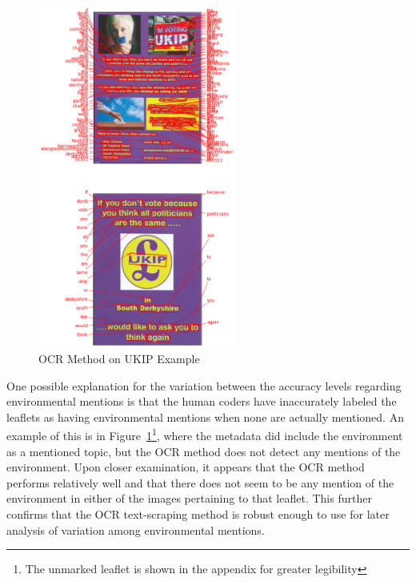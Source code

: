 \documentclass[12pt,letterpaper]{article}
\begin{document}
\vspace{1cm}





\begin{figure}
	\centering
	\includegraphics[width=0.58\textwidth]{ukip_example.png}
	\caption{OCR Method on UKIP Example}
	\label{fig:ukip_example}
\end{figure}




One possible explanation for the variation between the accuracy levels regarding environmental mentions is that the human coders have inaccurately labeled the leaflets as having environmental mentions when none are actually mentioned. An example of this is in Figure~\ref{fig:ukip_example}\footnote{The unmarked leaflet is shown in the appendix for greater legibility}, where the metadata did include the environment as a mentioned topic, but the OCR method does not detect any mentions of the environment. Upon closer examination, it appears that the OCR method performs relatively well and that there does not seem to be any mention of the environment in either of the images pertaining to that leaflet. This further confirms that the OCR text-scraping method is robust enough to use for later analysis of variation among environmental mentions. 
\end{document}
